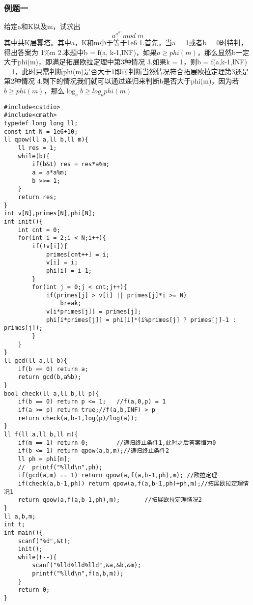 \subsubsection{例题一}
给定a和K以及m，试求出
$$
a^{a^{a^{\cdots}}}mod\;m
$$
其中共K层幂塔。其中a，K和m小于等于1e6
\newline
1.首先，当a = 1或者b = 0时特判，得出答案为 1\%m
\newline
2.本题中b = f(a, k-1,INF)，如果$ a \ge phi(m) $，那么显然b一定大于phi(m)，即满足拓展欧拉定理中第3种情况
\newline
3.如果k = 1，则b = f(a,k-1,INF) = 1，此时只需判断phi(m)是否大于1即可判断当然情况符合拓展欧拉定理第3还是第2种情况
\newline
4.剩下的情况我们就可以通过递归来判断b是否大于phi(m)，因为若$ b \ge phi(m) $，那么$ \log_ab\ge log_a{phi(m)} $
\newline
\begin{lstlisting}
#include<cstdio>
#include<cmath>
typedef long long ll;
const int N = 1e6+10;
ll qpow(ll a,ll b,ll m){
	ll res = 1;
	while(b){
		if(b&1) res = res*a%m;
		a = a*a%m;
		b >>= 1;
	}
	return res;
}
int v[N],primes[N],phi[N];
int init(){
	int cnt = 0;
	for(int i = 2;i < N;i++){
		if(!v[i]){
			primes[cnt++] = i;
			v[i] = i;
			phi[i] = i-1;
		}
		for(int j = 0;j < cnt;j++){
			if(primes[j] > v[i] || primes[j]*i >= N)
				break;
			v[i*primes[j]] = primes[j];
			phi[i*primes[j]] = phi[i]*(i%primes[j] ? primes[j]-1 : primes[j]);
		}
	}
}
ll gcd(ll a,ll b){
	if(b == 0) return a;
	return gcd(b,a%b);
}
bool check(ll a,ll b,ll p){
	if(b == 0) return p <= 1;	//f(a,0,p) = 1
	if(a >= p) return true;//f(a,b,INF) > p
	return check(a,b-1,log(p)/log(a)); 
}
ll f(ll a,ll b,ll m){
	if(m == 1) return 0;		//递归终止条件1,此时之后答案恒为0 
	if(b <= 1) return qpow(a,b,m);//递归终止条件2 
	ll ph = phi[m];
	//	printf("%lld\n",ph);
	if(gcd(a,m) == 1) return qpow(a,f(a,b-1,ph),m);	//欧拉定理 
	if(check(a,b-1,ph)) return qpow(a,f(a,b-1,ph)+ph,m);//拓展欧拉定理情况1 
	return qpow(a,f(a,b-1,ph),m); 		//拓展欧拉定理情况2 
}
ll a,b,m;
int t;
int main(){
	scanf("%d",&t);
	init();
	while(t--){
		scanf("%lld%lld%lld",&a,&b,&m);
		printf("%lld\n",f(a,b,m));
	}
	return 0;
}
\end{lstlisting}

